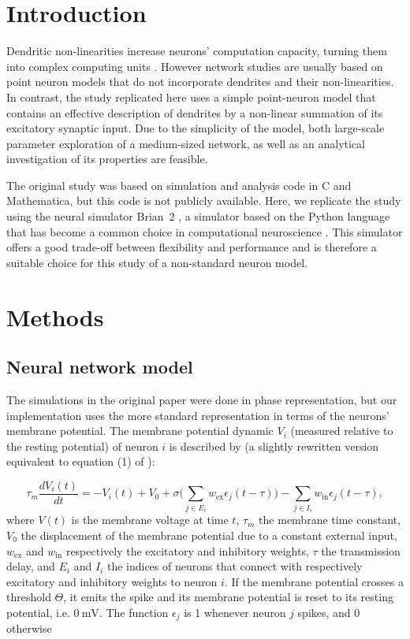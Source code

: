\documentclass[10pt,a4paper,onecolumn]{article}
\begin{document}
\section*{Introduction}
Dendritic non-linearities increase neurons' computation capacity, turning them into complex computing units \cite{Poirazi2003a}. However network studies are usually based on point neuron models that do not incorporate dendrites and their non-linearities. In contrast, the study replicated here \cite{Memmesheimer2012} uses a simple point-neuron model that contains an effective description of dendrites by a non-linear summation of its excitatory synaptic input. Due to the simplicity of the model, both large-scale parameter exploration of a medium-sized network, as well as an analytical investigation of its properties are feasible.

The original study was based on simulation and analysis code in C and Mathematica, but this code is not publicly available. Here, we replicate the study using the neural simulator Brian~2 \cite{Goodman2009,Stimberg2014}, a simulator based on the Python language that has become a common choice in computational neuroscience \cite{Muller2015}. This simulator offers a good trade-off between flexibility and performance and is therefore a suitable choice for this study of a non-standard neuron model.

\section*{Methods}
\subsection*{Neural network model}
The simulations in the original paper were done in phase representation, but our implementation uses the more standard representation in terms of the neurons' membrane potential. The membrane potential dynamic $V_i$ (measured relative to the resting potential) of neuron $i$ is described by (a slightly rewritten version equivalent to equation (1) of \cite{Memmesheimer2012}):

\begin{equation}
\tau_m \frac{dV_i(t)}{dt} = - V_i(t) + V_0 + \sigma \big( \sum_{j\in E_i} w_\text{ex} \epsilon_{j}(t-\tau) \big) - \sum_{j \in I_i} w_\text{in}\epsilon_{j}(t-\tau),
\end{equation}
where $V(t)$ is the membrane voltage at time $t$, $\tau_m$ the membrane time constant, $V_0$ the displacement of the membrane potential due to a constant external input, $w_\text{ex}$ and $w_\text{in}$ respectively the excitatory and inhibitory weights, $\tau$ the transmission delay, and $E_i$ and $I_i$ the indices of neurons that connect with respectively excitatory and inhibitory weights to neuron $i$. If the membrane potential crosses a threshold $\Theta$, it emits the spike and its membrane potential is reset to its resting potential, i.e. $\SI{0}{\milli\volt}$. The function $\epsilon_{j}$ is 1 whenever neuron $j$ spikes, and 0 otherwise
\end{document}
